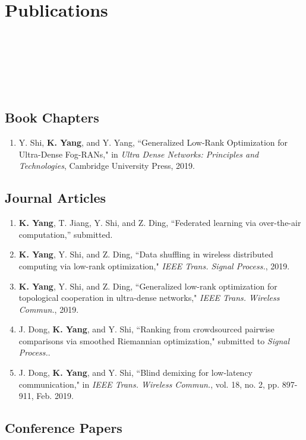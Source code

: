 \documentclass{article}
\begin{document}
\section*{\colorbox{mygrey}{Publications~~~~~~~~~~~~~~~~~~~~~~~~~~~~~~~~~~~~~~~~~~~~~~~~~~~~~~~~~~~~~~~~~~~~~~~~~~~~~~~~~~~~~~~}}

\subsection*{Book Chapters}
\begin{enumerate}
\item Y. Shi, {\bf{K. Yang}}, and Y. Yang,
``Generalized Low-Rank Optimization for Ultra-Dense Fog-RANs," in {\emph{Ultra Dense Networks: Principles and Technologies}}, Cambridge University Press, 2019.
\end{enumerate}

\subsection*{Journal Articles}

\begin{enumerate}
\item {\bf{K. Yang}}, T. Jiang, Y. Shi, and Z. Ding, “Federated learning via over-the-air computation,” submitted.
\item {\bf{K. Yang}}, Y. Shi, and Z. Ding, ``Data shuffling in wireless distributed computing via low-rank optimization," \emph{IEEE Trans. Signal Process.}, 2019.
\item {\bf{K. Yang}}, Y. Shi, and Z. Ding, ``Generalized
low-rank optimization for topological cooperation in ultra-dense networks," \emph{IEEE Trans. Wireless Commun.}, 2019.
\item {{J. Dong}}, {\bf{K. Yang}}, and Y. Shi, ``Ranking from crowdsourced pairwise comparisons via smoothed Riemannian optimization," submitted to {\emph{Signal Process.}}.
\item J. Dong, {\bf{K. Yang}}, and Y. Shi, ``Blind demixing for low-latency communication," in \emph{IEEE
Trans. Wireless Commun.}, vol. 18, no. 2, pp. 897-911, Feb. 2019.
\end{enumerate}

\subsection*{Conference Papers}
\end{document}
